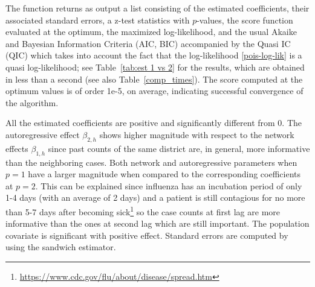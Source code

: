 The function  returns as output a list consisting of  the estimated coefficients, their associated standard errors, a z-test statistics with $p$-values, the score function evaluated at the optimum, the maximized log-likelihood, and the usual Akaike and Bayesian Information Criteria (AIC, BIC) accompanied by  the Quasi IC (QIC) \citep{pan2001} which takes into account the fact that the log-likelihood \eqref{pois-log-lik} is a quasi log-likelihood; see  Table~\ref{tab:est 1 vs 2} for the results, which are obtained in less than a  second (see also Table~\ref{comp_times}). The score computed at the optimum values is of order 1e-5, on average, indicating  successful convergence of the algorithm.


\begin{table}[ht]
	
	\centering
	\caption{Estimation of linear PNAR model \eqref{pnar_pq} for $p=1,2$ and $Z =$ . 
		Standard errors of coefficients are given in parentheses.}
	\label{tab:est 1 vs 2}
\end{table}
All the estimated coefficients are positive and significantly different from 0. The autoregressive effect $\beta_{2,h}$ shows  higher magnitude with respect to the network effects $\beta_{1,h}$ since  past counts of the same district are, in general, more informative than the neighboring  cases.
Both  network and autoregressive parameters when $p=1$ have a larger  magnitude when compared  to the corresponding coefficients at $p=2$. This can be explained since influenza has an incubation period of only 1-4 days (with an average of 2 days) and a patient is still contagious for no more than 5-7 days after becoming sick\footnote{\href{https://www.cdc.gov/flu/about/disease/spread.htm}{https://www.cdc.gov/flu/about/disease/spread.htm}} so the case counts at first lag are more informative  than the ones at second lag which are still important. 
The population covariate is  significant with positive effect.  Standard errors are computed by using the sandwich estimator.

